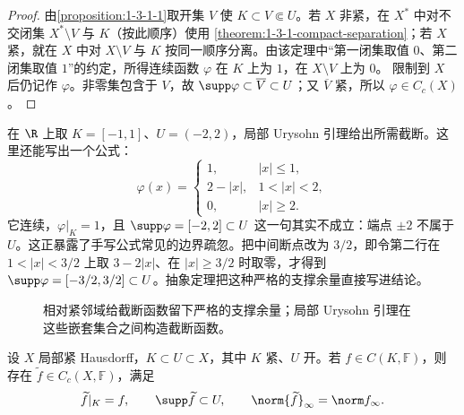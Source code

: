 \begin{proof}
由\cref{proposition:1-3-1-1}取开集 $V$ 使 $K\subset V\Subset U$。若 $X$ 非紧，在 $X^*$
中对不交闭集 $X^*\setminus V$ 与 $K$（按此顺序）使用
\cref{theorem:1-3-1-compact-separation}；若 $X$ 紧，就在 $X$ 中对 $X\setminus V$ 与 $K$
按同一顺序分离。由该定理中“第一闭集取值 $0$、第二闭集取值 $1$”的约定，所得连续函数
$\varphi$ 在 $K$ 上为 $1$，在 $X\setminus V$ 上为 $0$。
限制到 $X$ 后仍记作 $\varphi$。非零集包含于 $V$，故
$\supp\varphi\subset\overline V\subset U$；又 $\overline V$ 紧，所以 $\varphi\in C_c(X)$。
\end{proof}

\begin{example}[支撑受控的截断]\label{ex:1-3-1-3}
在 $\R$ 上取 $K=[-1,1]$、$U=(-2,2)$，局部 Urysohn 引理给出所需截断。这里还能写出一个公式：
\[
 \varphi(x)=
 \begin{cases}
  1,&|x|\le1,\\
  2-|x|,&1<|x|<2,\\
  0,&|x|\ge2.
 \end{cases}
\]
它连续，$\varphi|_K=1$，且 $\supp\varphi=[-2,2]\subset U$ 这一句其实不成立：端点
$\pm2$ 不属于 $U$。这正暴露了手写公式常见的边界疏忽。把中间断点改为 $3/2$，即令第二行在
$1<|x|<3/2$ 上取 $3-2|x|$、在 $|x|\ge3/2$ 时取零，才得到
$\supp\varphi=[-3/2,3/2]\subset U$。抽象定理把这种严格的支撑余量直接写进结论。
\end{example}

\begin{figure}[htbp]
\centering
{}
\caption{相对紧邻域给截断函数留下严格的支撑余量；局部 Urysohn 引理在这些嵌套集合之间构造截断函数。}
\label{fig:1-3-1-cutoff}
\end{figure}

\begin{theorem}\label{theorem:1-3-1-3}
设 $X$ 局部紧 Hausdorff，$K\subset U\subset X$，其中 $K$ 紧、$U$ 开。若
$f\in C(K,\mathbb F)$，则存在 $\widetilde f\in C_c(X,\mathbb F)$，满足
\[
 \widetilde f|_K=f,\qquad
 \supp\widetilde f\subset U,\qquad
 \norm{\widetilde f}_\infty=\norm f_\infty.
\]
\end{theorem}


